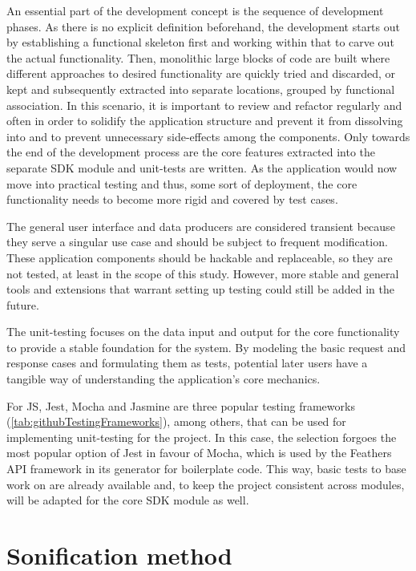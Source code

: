 An essential part of the development concept is the sequence of development phases.
As there is no explicit definition beforehand, the development starts out by establishing a functional skeleton first and working within that to carve out the actual functionality.
Then, monolithic large blocks of code are built where different approaches to desired functionality are quickly tried and discarded, or kept and subsequently extracted into separate locations, grouped by functional association.
In this scenario, it is important to review and refactor regularly and often in order to solidify the application structure and prevent it from dissolving into  and to prevent unnecessary side-effects among the components.
Only towards the end of the development process are the core features extracted into the separate \ac{SDK} module and unit-tests are written.
As the application would now move into practical testing and thus, some sort of  deployment, the core functionality needs to become more rigid and covered by test cases.

The general user interface and data producers are considered transient because they serve a singular use case and should be subject to frequent modification.
These application components should be hackable and replaceable, so they are not tested, at least in the scope of this study.
However, more stable and general tools and extensions that warrant setting up testing could still be added in the future.

The unit-testing focuses on the data input and output for the core functionality to provide a stable foundation for the system.
By modeling the basic request and response cases and formulating them as tests, potential later users have a tangible way of understanding the application's core mechanics.

For \ac{JS}, Jest, Mocha and Jasmine are three popular testing frameworks (\ref{tab:githubTestingFrameworks}), among others, that can be used for implementing unit-testing for the project.
In this case, the selection forgoes the most popular option of Jest in favour of Mocha, which is used by the Feathers \ac{API} framework in its generator for boilerplate code.
This way, basic tests to base work on are already available and, to keep the project consistent across modules, will be adapted for the core \ac{SDK} module as well.



\section{Sonification method}

